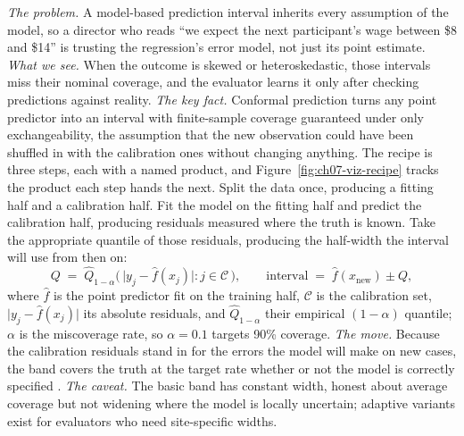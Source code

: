 \documentclass[
    a4paper,
    fontsize=10pt,
    twoside=true,
    numbers=noenddot,
]{kaobook}
\begin{document}
\emph{The problem.} A model-based prediction interval inherits every assumption of the model, so a director who reads \enquote{we expect the next participant's wage between \$8 and \$14} is trusting the regression's error model, not just its point estimate. \emph{What we see.} When the outcome is skewed or heteroskedastic, those intervals miss their nominal coverage, and the evaluator learns it only after checking predictions against reality. \emph{The key fact.} Conformal prediction \parencite{shafer2008tutorial,angelopoulos2023conformal} turns any point predictor into an interval with finite-sample coverage guaranteed under only exchangeability, the assumption that the new observation could have been shuffled in with the calibration ones without changing anything. The recipe is three steps, each with a named product, and Figure~\ref{fig:ch07-viz-recipe} tracks the product each step hands the next. Split the data once, producing a fitting half and a calibration half. Fit the model on the fitting half and predict the calibration half, producing residuals measured where the truth is known. Take the appropriate quantile of those residuals, producing the half-width the interval will use from then on:
\begin{equation}
  Q \;=\; \widehat{Q}_{1-\alpha}\!\bigl(\,\lvert y_j - \hat f(x_j)\rvert : j \in \mathcal{C}\,\bigr),
  \qquad
  \text{interval} \;=\; \hat f(x_{\text{new}}) \pm Q,
  \label{eq:ch07-viz-conformal}
\end{equation}
where $\hat f$ is the point predictor fit on the training half, $\mathcal{C}$ is the calibration set, $\lvert y_j-\hat f(x_j)\rvert$ its absolute residuals, and $\widehat{Q}_{1-\alpha}$ their empirical $(1-\alpha)$ quantile; $\alpha$ is the miscoverage rate, so $\alpha=0.1$ targets 90\% coverage. \emph{The move.} Because the calibration residuals stand in for the errors the model will make on new cases, the band covers the truth at the target rate whether or not the model is correctly specified \parencite{lei2018distribution}. \emph{The caveat.} The basic band has constant width, honest about average coverage but not widening where the model is locally uncertain; adaptive variants exist for evaluators who need site-specific widths.
\end{document}
